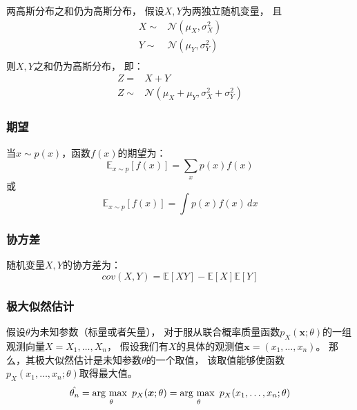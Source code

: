 两高斯分布之和仍为高斯分布，
假设{$X,Y$}为两独立随机变量，
且
\begin{align}
    X\sim & \mathcal{N}(\mu_X,\sigma_{X}^{2}) \\ 
    Y\sim & \mathcal{N}(\mu_Y,\sigma_{Y}^{2}) \\
\end{align}
则{$X,Y$}之和仍为高斯分布，
即：
\begin{align}
    Z=&X+Y\\
    Z\sim& \mathcal{N}(\mu_X+\mu_Y,\sigma_{X}^{2}+\sigma_{Y}^{2})  \label{eq:sum_of_two_gaussian_distributions}
\end{align}

\subsubsection{期望}
当{$x \sim p(x)$}，函数{$f(x)$}的期望为：
\begin{equation}
    \label{eq:expection_discrete}
    \mathbb{E}_{x \sim p} [ f(x)] = \sum_{x} p(x)f(x)
\end{equation}
或
\begin{equation}
    \label{eq:expection_continuous}
    \mathbb{E}_{x \sim p} [ f(x)] = \int p(x)f(x) \,dx
\end{equation}

\subsubsection{协方差}
随机变量{$X,Y$}的协方差为：
\begin{equation}
    \label{eq:covariance}
    cov(X,Y)=\mathbb{E}\left[XY\right]-\mathbb{E}\left[X\right]\mathbb{E}\left[Y\right]
\end{equation}


\subsubsection{极大似然估计}

假设{$\theta$}为未知参数（标量或者矢量），
对于服从联合概率质量函数{$p_{X}(\bm{x};\theta)$}的一组观测向量{$X={X_1,\ldots,X_n}$}，
假设我们有{$X$}的具体的观测值{$\bm{x}=(x_1,\ldots,x_n)$}。
那么，其极大似然估计是未知参数{$\theta$}的一个取值，
该取值能够使函数{$p_{X}(x_1,\ldots,x_n;\theta)$}取得最大值。
\begin{equation}
    \label{eq:maximux_likelihood_estimation_orgin}
    \hat{\theta_n}
    =\argmax_{\theta} p_X(\bm{x};\theta)
    =\argmax_{\theta} p_X(x_1,\ldots,x_n;\theta)
\end{equation}



